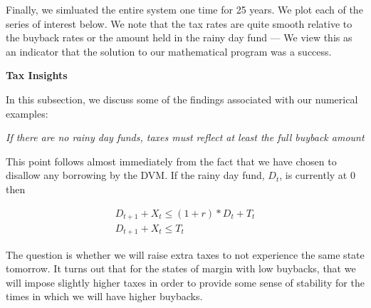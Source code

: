 Finally, we simluated the entire system one time for 25 years. We plot each of the series of
interest below. We note that the tax rates are quite smooth relative to the buyback rates or the
amount held in the rainy day fund --- We view this as an indicator that the solution to our
mathematical program was a success.

\begin{center}
  \begin{figure}[H]
    \label{fig:sm_simulationplots}
  \end{figure}
\end{center}

\textbf{Tax Insights}

In this subsection, we discuss some of the findings associated with our numerical examples:

\vspace{0.25cm}

\textit{If there are no rainy day funds, taxes must reflect at least the full buyback amount}

This point follows almost immediately from the fact that we have chosen to disallow any borrowing by
the DVM. If the rainy day fund, $D_t$, is currently at 0 then

\begin{align*}
  D_{t+1} + X_{t} \leq (1 + r)*D_t + T_t \\
  D_{t+1} + X_{t} \leq T_t
\end{align*}

The question is whether we will raise extra taxes to not experience the same state tomorrow. It
turns out that for the states of margin with low buybacks, that we will impose slightly higher taxes
in order to provide some sense of stability for the times in which we will have higher buybacks.

